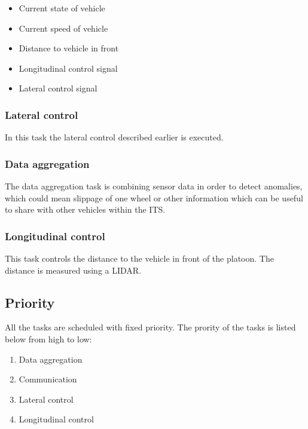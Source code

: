 \begin{itemize}
  \item Current state of vehicle
  \item Current speed of vehicle
  \item Distance to vehicle in front
  \item Longitudinal control signal
  \item Lateral control signal
\end{itemize}

\subsubsection{Lateral control}
In this task the lateral control described earlier is executed.
\subsubsection{Data aggregation}
The data aggregation task is combining sensor data in order to detect anomalies, which could mean slippage of one wheel or other information which can be useful to share with other vehicles within the ITS.  
\subsubsection{Longitudinal control}
This task controls the distance to the vehicle in front of the platoon. The distance is measured using a LIDAR.\\
 

\subsection{Priority}
All the tasks are scheduled with fixed priority. The prority of the tasks is listed below from high to low:

\begin{enumerate}
  \item Data aggregation
  \item Communication
  \item Lateral control
  \item Longitudinal control
\end{enumerate}




